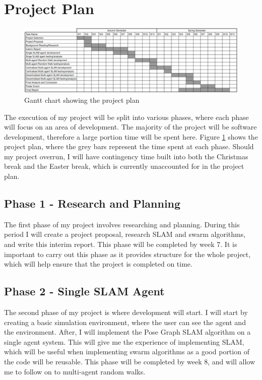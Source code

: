 \documentclass[12pt]{article}
\begin{document}
\section{Project Plan}
\begin{figure}[H]
    \centering
    \includegraphics[width=0.8\linewidth]{gantt_chart.png}
    \caption{Gantt chart showing the project plan}
    \label{fig:gantt_chart}
\end{figure}
The execution of my project will be split into various phases, where each phase will focus on an area of development. The
majority of the project will be software development, therefore a large portion time will be spent here. Figure
\ref{fig:gantt_chart} shows the project plan, where the grey bars represent the time spent at each phase. Should my project
overrun, I will have contingency time built into both the Christmas break and the Easter break, which is currently unaccounted
for in the project plan.\\

\subsection{Phase 1 - Research and Planning}
The first phase of my project involves researching and planning. During this period I will create a project proposal,
research SLAM and swarm algorithms, and write this interim report. This phase will be completed by week 7. It is important
to carry out this phase as it provides structure for the whole project, which will help ensure that the project is completed
on time.
\subsection{Phase 2 - Single SLAM Agent}
The second phase of my project is where development will start. I will start by creating a basic simulation environment, where
the user can see the agent and the environment. After, I will implement the Pose Graph SLAM algorithm on a single agent system.
This will give me the experience of implementing SLAM, which will be useful when implementing swarm algorithms as a good portion
of the code will be reusable. This phase will be completed by week 8, and will allow me to follow on to multi-agent random walks.
\end{document}
